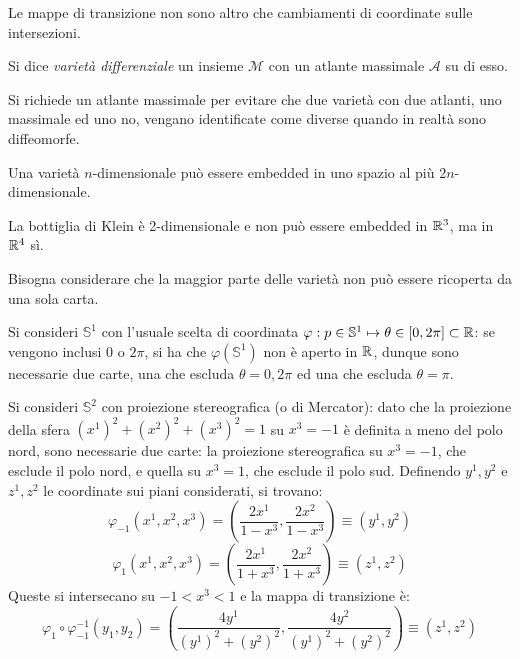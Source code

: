 Le mappe di transizione non sono altro che cambiamenti di coordinate sulle intersezioni.

\begin{definition}
	Si dice \textit{varietà differenziale} un insieme $ \mathcal{M} $ con un atlante massimale $ \mathcal{A} $ su di esso.
\end{definition}

Si richiede un atlante massimale per evitare che due varietà con due atlanti, uno massimale ed uno no, vengano identificate come diverse quando in realtà sono diffeomorfe.

\begin{theorem}[di Whitney]
	Una varietà $ n $-dimensionale può essere embedded in uno spazio al più $ 2n $-dimensionale.
\end{theorem}

\begin{example}
	La bottiglia di Klein è 2-dimensionale e non può essere embedded in $ \mathbb{R}^3 $, ma in $ \mathbb{R}^4 $ sì.
\end{example}

Bisogna considerare che la maggior parte delle varietà non può essere ricoperta da una sola carta.

\begin{example}
	Si consideri $ \mathbb{S}^1 $ con l'usuale scelta di coordinata $ \varphi : p \in \mathbb{S}^1 \mapsto \theta \in [0,2\pi] \subset \mathbb{R} $: se vengono inclusi $ 0 $ o $ 2\pi $, si ha che $ \varphi(\mathbb{S}^1) $ non è aperto in $ \mathbb{R} $, dunque sono necessarie due carte, una che escluda $ \theta = 0,2\pi $ ed una che escluda $ \theta = \pi $.
\end{example}

\begin{example}
	Si consideri $ \mathbb{S}^2 $ con proiezione stereografica (o di Mercator): dato che la proiezione della sfera $ (x^1)^2 + (x^2)^2 + (x^3)^2 = 1 $ su $ x^3 = -1 $ è definita a meno del polo nord, sono necessarie due carte: la proiezione stereografica su $ x^3 = -1 $, che esclude il polo nord, e quella su $ x^3 = 1 $, che esclude il polo sud. Definendo $ y^1,y^2 $ e $ z^1,z^2 $ le coordinate sui piani considerati, si trovano:
	\begin{equation*}
		\varphi_{-1} (x^1,x^2,x^3) = \left( \frac{2x^1}{1 - x^3}, \frac{2x^2}{1-x^3} \right) \equiv (y^1,y^2)
	\end{equation*}
	\begin{equation*}
		\varphi_1 (x^1,x^2,x^3) = \left( \frac{2x^1}{1 + x^3}, \frac{2x^2}{1 + x^3} \right) \equiv (z^1,z^2)
	\end{equation*}
	Queste si intersecano su $ -1 < x^3 < 1 $ e la mappa di transizione è:
	\begin{equation*}
		\varphi_1 \circ \varphi_{-1}^{-1} (y_1,y_2) = \left( \frac{4y^1}{(y^1)^2 + (y^2)^2}, \frac{4y^2}{(y^1)^2 + (y^2)^2} \right) \equiv (z^1,z^2)
	\end{equation*}
\end{example}

